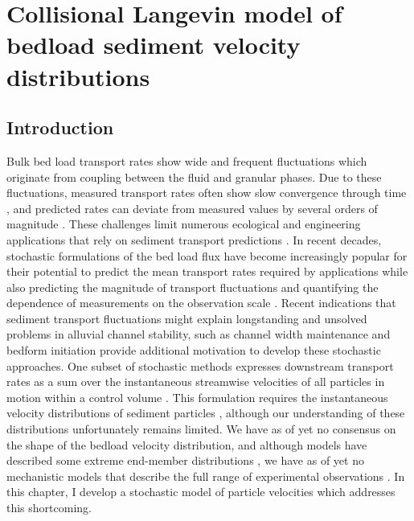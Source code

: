 
\chapter{Collisional Langevin model of bedload sediment velocity distributions}
\label{ch:langevin}
\section{Introduction}

Bulk bed load transport rates show wide and frequent fluctuations which originate from coupling between the fluid and granular phases.
Due to these fluctuations, measured transport rates often show slow convergence through time \citep{Dhont2018,Turowski2010}, and predicted rates can deviate from measured values by several orders of magnitude \citep{Recking2012,Martin2003}.
These challenges limit numerous ecological and engineering applications that rely on sediment transport predictions \citep{Gaeuman2017,Malmon2005}.
In recent decades, stochastic formulations of the bed load flux have become increasingly popular for their potential to predict the mean transport rates required by applications while also predicting the magnitude of transport fluctuations \citep{Ancey2008} and quantifying the dependence of measurements on the observation scale \citep{Turowski2010}. 
Recent indications that sediment transport fluctuations might explain longstanding and unsolved problems in alluvial channel stability, such as channel width maintenance \citep{Abramian2019} and bedform initiation \citep{Jerolmack2005,Bohorquez2016} provide additional motivation to develop these stochastic approaches.
One subset of stochastic methods expresses downstream transport rates as a sum over the instantaneous streamwise velocities of all particles in motion within a control volume \citep{Ancey2008,Furbish2012}.
This formulation requires the instantaneous velocity distributions of sediment particles \citep{Lajeunesse2010}, although our understanding of these distributions unfortunately remains limited.
We have as of yet no consensus on the shape of the bedload velocity distribution, and although models have described some extreme end-member distributions \citep[e.g.][]{Fan2014,Ancey2014}, we have as of yet no mechanistic models that describe the full range of experimental observations \citep{Lajeunesse2010,Fathel2015,Heyman2016,Liu2019,Houssais2012}.
In this chapter, I develop a stochastic model of particle velocities which addresses this shortcoming.

